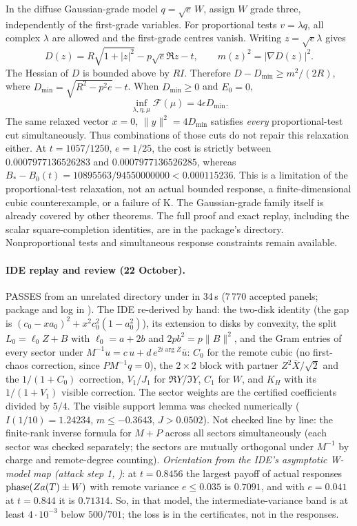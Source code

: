 In the diffuse Gaussian-grade model $q=\sqrt e\,W$, assign $W$ grade
three, independently of the first-grade variables. For proportional
tests $v=\lambda q$, all complex $\lambda$ are allowed and the
first-grade centres vanish. Writing $z=\sqrt e\lambda$ gives
\[
 D(z)=R\sqrt{1+|z|^2}-p\sqrt e\Re z-t,\qquad
 m(z)^2=|\nabla D(z)|^2.
\]
The Hessian of $D$ is bounded above by $RI$. Therefore
$D-D_{\min}\ge m^2/(2R)$, where
$D_{\min}=\sqrt{R^2-p^2e}-t$. When $D_{\min}\ge0$ and $E_0=0$,
\[
 \inf_{\lambda,\eta,\mu}\mathcal F(\mu)=4\epsilon D_{\min}.
\]
The same relaxed vector $x=0$, $\|y\|^2=4D_{\min}$ satisfies
\emph{every} proportional-test cut simultaneously. Thus combinations
of those cuts do not repair this relaxation either.
At $t=1057/1250$, $e=1/25$, the cost is strictly between
$0.0007977136526283$ and $0.0007977136526285$, whereas
$B_*-B_0(t)=10895563/94550000000<0.000115236$.
This is a limitation of the proportional-test relaxation, not an actual
bounded response, a finite-dimensional cubic counterexample, or a failure
of K. The Gaussian-grade family itself is already covered by other
theorems. The full proof and exact replay, including the scalar
square-completion identities, are in the package's 
directory. Nonproportional tests and simultaneous response constraints
remain available.

\paragraph{IDE replay and review (22 October).}  PASSES from an unrelated directory under  in 34\,s (7\,770 accepted panels;
package and log in ). The IDE re-derived by hand: the two-disk identity (the gap is $(c_0-xa_0)^2+x^2c_0^2(1-a_0^2)$),
its extension to disks by convexity, the split $L_0=\ell_0Z+B$ with $\ell_0=a+2b$ and $2pb^2=p\|B\|^2$, and the Gram entries of every sector under $M^{-1}u=c\,u+d\,e^{2i\arg Z}\bar u$:
$C_0$ for the remote cubic (no first-chaos correction, since $PM^{-1}q=0$), the $2\times2$ block with partner $Z^2\bar X/\sqrt2$ and the $1/(1+C_0)$ correction,
$V_1$/$J_1$ for $\Re Y$/$\Im Y$, $C_1$ for $W$, and $K_H$ with its $1/(1+V_1)$ visible correction. The sector weights are the certified coefficients divided by $5/4$.
The visible support lemma was checked numerically ($I(1/10)=1.24234$, $m\le-0.3643$, $J>0.0502$). Not checked line by line: the finite-rank inverse formula for $M+P$ across all sectors simultaneously
(each sector was checked separately; the sectors are mutually orthogonal under $M^{-1}$ by charge and remote-degree counting).
\emph{Orientation from the IDE's asymptotic W-model map (attack step 1, )}: at $t=0.8456$ the largest payoff of actual responses $\operatorname{phase}(Za(T)\pm W)$
with remote variance $e\le0.035$ is $0.7091$, and with $e=0.041$ at $t=0.844$ it is $0.71314$. So, in that model, the intermediate-variance band is at least $4\cdot10^{-3}$ below $500/701$; the
loss is in the certificates, not in the responses.
